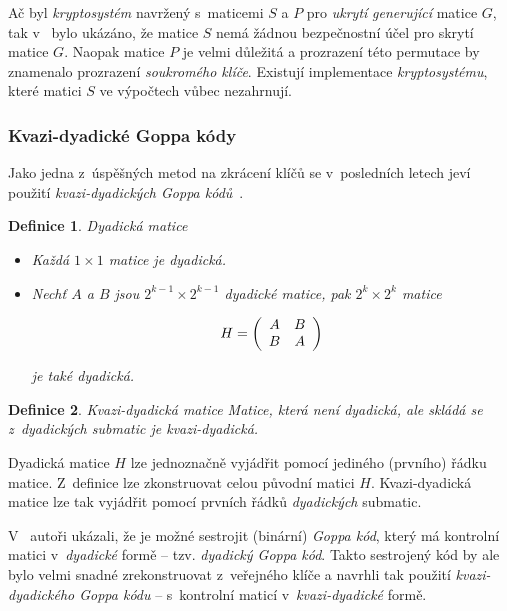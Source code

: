 \documentclass[thesis=M,czech,hidelinks]{FITthesis}[2012/06/26]
\newcommand{\0}{{\textcolor[gray]{0.80}{0}}}
\newtheorem{definice}{Definice}
\begin{document}
Ač byl \emph{kryptosystém} navržený s~maticemi $S$ a $P$ pro \emph{ukrytí}
\emph{generující} matice $G$, tak v~\cite{Engelbert} bylo ukázáno, že matice $S$
nemá žádnou bezpečnostní účel pro skrytí matice $G$. Naopak matice $P$ je velmi
důležitá a prozrazení této permutace by znamenalo prozrazení \emph{soukromého
klíče}. Existují implementace \emph{kryptosystému}, které matici $S$ ve
výpočtech vůbec nezahrnují.


\subsubsection{Kvazi-dyadické Goppa kódy}\label{kap_kvazi}

Jako jedna z~úspěšných metod na zkrácení klíčů se v~posledních letech jeví
použití \emph{kvazi-dyadických Goppa kódů}~\cite{Misoczki1}.

\begin{definice}{Dyadická matice}
    \begin{itemize}
        \item Každá $1\times1$ matice je \emph{dyadická}. \\

        \item Nechť $A$ a $B$ jsou $2^{k-1}\times2^{k-1}$ \emph{dyadické}
            matice, pak
            $2^k\times2^k$ matice

            $$
                H = \left(\begin{array}{c c}
                    A & B\\
                    B & A
                \end{array}\right)
            $$

            je také \emph{dyadická}.

    \end{itemize}
\end{definice}


\begin{definice}{Kvazi-dyadická matice}
    Matice, která není \emph{dyadická}, ale skládá se z~\emph{dyadických}
    submatic je \emph{kvazi-dyadická}.
\end{definice}

Dyadická matice $H$ lze jednoznačně vyjádřit pomocí jediného (prvního) řádku
matice. Z~definice lze zkonstruovat celou původní matici $H$. Kvazi-dyadická
matice lze tak vyjádřit pomocí prvních řádků \emph{dyadických} submatic.


V~\cite{Misoczki1} autoři ukázali, že je možné sestrojit (binární) \emph{Goppa
kód}, který má kontrolní matici v~\emph{dyadické} formě -- tzv. \emph{dyadický
Goppa kód}. Takto sestrojený kód by ale bylo velmi snadné zrekonstruovat
z~veřejného klíče a navrhli tak použití \emph{kvazi-dyadického Goppa kódu} --
s~kontrolní maticí v~\emph{kvazi-dyadické} formě.
\end{document}
